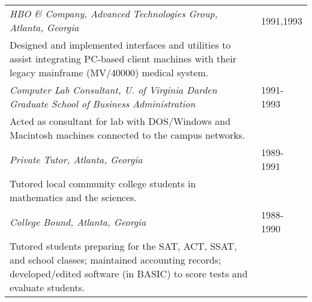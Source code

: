 \begin{tabular}{p{5.2in}@{\hspace{1.5cm}}l}
    \em HBO \& Company, Advanced Technologies Group, 
           Atlanta, Georgia                                      & 1991,1993 \\
       Designed and implemented interfaces and utilities to
       assist integrating PC-based client machines with their
       legacy mainframe (MV/40000) medical system. \\[9pt]

   \em Computer Lab Consultant, U. of Virginia  
      Darden Graduate School of Business Administration          & 1991-1993 \\
       Acted as consultant for lab with DOS/Windows and
       Macintosh machines connected to the campus networks. \\[9pt]

    \em Private Tutor, Atlanta, Georgia                          & 1989-1991 \\
       Tutored local community college students in mathematics
       and the sciences. \\[9pt]

    \em College Bound, Atlanta, Georgia                          & 1988-1990 \\
       Tutored students preparing for the SAT, ACT, SSAT,
       and school classes; maintained accounting records;
       developed/edited software (in BASIC) to score tests and evaluate 
       students. \\[9pt]
\end{tabular}








